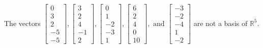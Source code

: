 \begin{exercise}
\begin{exerciseStatement}
  \end{exerciseStatement}
  \begin{exerciseAnswer}
   The vectors \(\left[\begin{array}{r}
0 \\
3 \\
2 \\
-5 \\
-5
\end{array}\right] , \left[\begin{array}{r}
3 \\
2 \\
4 \\
-1 \\
2
\end{array}\right] , \left[\begin{array}{r}
0 \\
1 \\
-2 \\
-3 \\
1
\end{array}\right] , \left[\begin{array}{r}
6 \\
2 \\
4 \\
0 \\
10
\end{array}\right] , \text{ and } \left[\begin{array}{r}
-3 \\
-2 \\
-4 \\
1 \\
-2
\end{array}\right]\) 
  	 are not  a basis of \(\mathbb{R}^5\).
  


  \end{exerciseAnswer}
\end{exercise}
